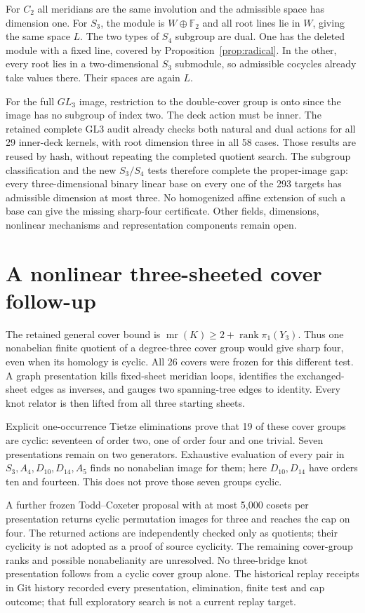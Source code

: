 \documentclass[11pt]{article}
\newcommand{\F}{\mathbb F}
\newcommand{\mr}{\operatorname{mr}}
\newcommand{\rank}{\operatorname{rank}}
\begin{document}
For $C_2$ all meridians are the same involution and the
admissible space has dimension one. For $S_3$, the module is
$W\oplus\F_2$ and all root lines lie in $W$, giving the same
space $L$. The two types of $S_4$ subgroup are dual. One has
the deleted module with a fixed line, covered by
Proposition~\ref{prop:radical}. In the other, every root lies
in a two-dimensional $S_3$ submodule, so admissible cocycles
already take values there. Their spaces are again $L$.

For the full $GL_3$ image, restriction to the double-cover
group is onto since the image has no subgroup of index two.
The deck action must be inner. The retained complete GL3
audit already checks both natural and dual actions for all
29 inner-deck kernels, with root dimension three in all 58
cases. Those results are reused by hash, without repeating
the completed quotient search. The subgroup classification
and the new $S_3/S_4$ tests therefore complete the proper-image
gap: every three-dimensional binary linear base on every
one of the 293 targets has admissible dimension at most three.
No homogenized affine extension of such a base can give the
missing sharp-four certificate. Other fields, dimensions,
nonlinear mechanisms and representation components remain open.

\section{A nonlinear three-sheeted cover follow-up}

The retained general cover bound is
$\mr(K)\ge2+\rank\pi_1(Y_3)$. Thus one nonabelian finite
quotient of a degree-three cover group would give sharp four,
even when its homology is cyclic. All 26 covers were frozen
for this different test. A graph presentation kills fixed-sheet
meridian loops, identifies the exchanged-sheet edges as inverses,
and gauges two spanning-tree edges to identity. Every knot
relator is then lifted from all three starting sheets.

Explicit one-occurrence Tietze eliminations prove that 19 of
these cover groups are cyclic: seventeen of order two, one
of order four and one trivial. Seven presentations remain on
two generators. Exhaustive evaluation of every pair in
$S_3,A_4,D_{10},D_{14},A_5$ finds no nonabelian image for them;
here $D_{10},D_{14}$ have orders ten and fourteen. This does
not prove those seven groups cyclic.

A further frozen Todd--Coxeter proposal with at most 5,000
cosets per presentation returns cyclic permutation images for
three and reaches the cap on four. The returned actions are
independently checked only as quotients; their cyclicity is
not adopted as a proof of source cyclicity. The remaining
cover-group ranks and possible nonabelianity are unresolved.
No three-bridge knot presentation follows from a cyclic cover
group alone. The historical replay receipts in Git history recorded every
presentation, elimination, finite test and cap outcome; that full
exploratory search is not a current replay target.
\end{document}
